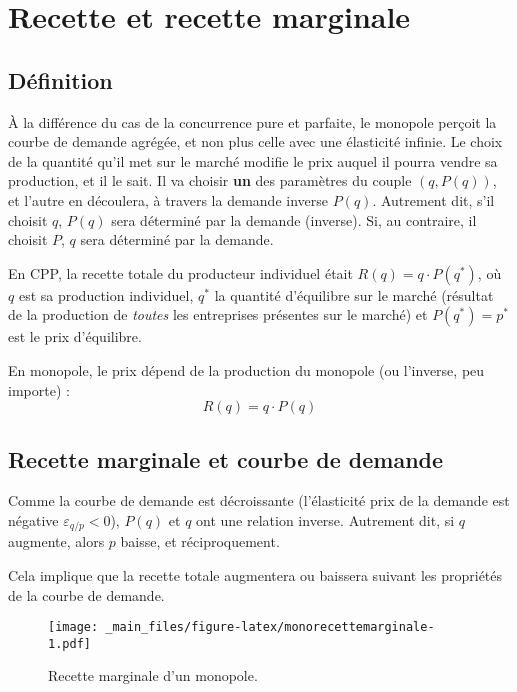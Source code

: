 \documentclass[
]{book}
\theoremstyle{definition}
\theoremstyle{definition}
\theoremstyle{definition}
\theoremstyle{definition}
\theoremstyle{remark}
\begin{document}
\hypertarget{recette-et-recette-marginale}{%
\section{Recette et recette marginale}\label{recette-et-recette-marginale}}

\hypertarget{duxe9finition}{%
\subsection{Définition}\label{duxe9finition}}

À la différence du cas de la concurrence pure et parfaite, le monopole perçoit la courbe de demande agrégée, et non plus celle avec une élasticité infinie.
Le choix de la quantité qu'il met sur le marché modifie le prix auquel il pourra vendre sa production, et il le sait.
Il va choisir \textbf{un} des paramètres du couple \((q, P(q))\), et l'autre en découlera, à travers la demande inverse \(P(q)\).
Autrement dit, s'il choisit \(q\), \(P(q)\) sera déterminé par la demande (inverse).
Si, au contraire, il choisit \(P\), \(q\) sera déterminé par la demande.

En CPP, la recette totale du producteur individuel était \(R(q) = q\cdot P(q^*)\), où \(q\) est sa production individuel, \(q^*\) la quantité d'équilibre sur le marché (résultat de la production de \emph{toutes} les entreprises présentes sur le marché) et \(P(q^*)=p^*\) est le prix d'équilibre.

En monopole, le prix dépend de la production du monopole (ou l'inverse, peu importe) :
\[
R(q) = q\cdot P(q)
\]

\hypertarget{recette-marginale-et-courbe-de-demande}{%
\subsection{Recette marginale et courbe de demande}\label{recette-marginale-et-courbe-de-demande}}

Comme la courbe de demande est décroissante (l'élasticité prix de la demande est négative \(\varepsilon_{q/p} <0\)), \(P(q)\) et \(q\) ont une relation inverse.
Autrement dit, si \(q\) augmente, alors \(p\) baisse, et réciproquement.

Cela implique que la recette totale augmentera ou baissera suivant les propriétés de la courbe de demande.

\begin{figure}
\centering
\texttt{[image: \_main\_files/figure-latex/monorecettemarginale-1.pdf]}
\caption{\label{fig:monorecettemarginale}Recette marginale d'un monopole.}
\end{figure}
\end{document}
